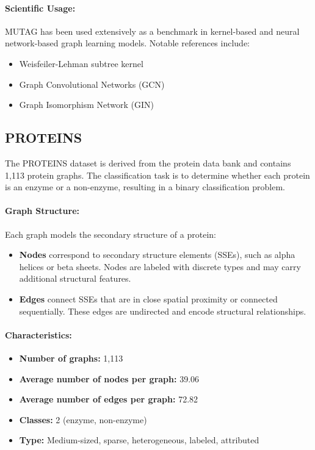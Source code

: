 \documentclass[11pt,a4paper]{article}
\begin{document}
\paragraph{Scientific Usage:}
MUTAG has been used extensively as a benchmark in kernel-based and neural network-based graph learning models. Notable references include:
\begin{itemize}
	\item Weisfeiler-Lehman subtree kernel \cite{shervashidze2011weisfeiler}
	\item Graph Convolutional Networks (GCN) \cite{kipf2017semi}
	\item Graph Isomorphism Network (GIN) \cite{xu2019powerful}
\end{itemize}

\subsection*{PROTEINS}

The PROTEINS dataset is derived from the protein data bank and contains 1,113 protein graphs. The classification task is to determine whether each protein is an enzyme or a non-enzyme, resulting in a binary classification problem.

\paragraph{Graph Structure:}
Each graph models the secondary structure of a protein:
\begin{itemize}
	\item \textbf{Nodes} correspond to secondary structure elements (SSEs), such as alpha helices or beta sheets. Nodes are labeled with discrete types and may carry additional structural features.
	\item \textbf{Edges} connect SSEs that are in close spatial proximity or connected sequentially. These edges are undirected and encode structural relationships.
\end{itemize}

\paragraph{Characteristics:}
\begin{itemize}
	\item \textbf{Number of graphs:} 1,113
	\item \textbf{Average number of nodes per graph:} 39.06
	\item \textbf{Average number of edges per graph:} 72.82
	\item \textbf{Classes:} 2 (enzyme, non-enzyme)
	\item \textbf{Type:} Medium-sized, sparse, heterogeneous, labeled, attributed
\end{itemize}
\end{document}
